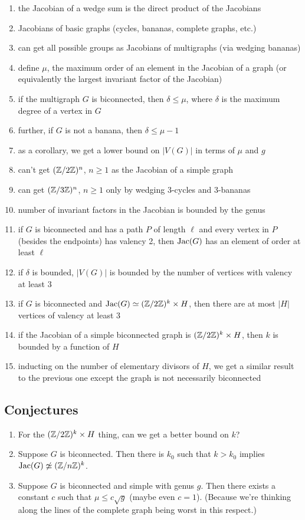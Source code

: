 \documentclass{amsart}
\begin{document}
\begin{enumerate}
\item the Jacobian of a wedge sum is the direct product
of the Jacobians
\item Jacobians of basic graphs (cycles, bananas,
complete graphs, etc.)
\item can get all possible groups as Jacobians of
multigraphs (via wedging bananas)
\item define $\mu$, the maximum order of an element in
the Jacobian of a graph (or equivalently the largest
invariant factor of the Jacobian)
\item if the multigraph $G$ is biconnected, then
$\delta\le\mu$, where $\delta$ is the maximum degree
of a vertex in $G$
\item further, if $G$ is not a banana, then
$\delta\le\mu-1$
\item as a corollary, we get a lower bound on $|V(G)|$
in terms of $\mu$ and $g$
\item can't get $(\mathbb{Z}/2\mathbb{Z})^n$, $n\ge1$ as the Jacobian
of a simple graph
\item can get $(\mathbb{Z}/3\mathbb{Z})^n$, $n\ge1$ only by wedging
3-cycles and 3-bananas
\item number of invariant factors in the Jacobian is
bounded by the genus
\item if $G$ is biconnected and has a path $P$ of length $\ell$ and every vertex in $P$ (besides the endpoints) has valency 2, then $\operatorname{Jac}(G)$ has an element of order at least $\ell$
\item if $\delta$ is bounded, $|V(G)|$ is bounded by the number of vertices with
valency at least 3
\item if $G$ is biconnected and $\operatorname{Jac}(G)\simeq(\mathbb{Z}/2\mathbb{Z})^k\times H$, then there are at most $|H|$ vertices of valency at least 3
\item if the Jacobian of a simple biconnected graph is $(\mathbb{Z}/2\mathbb{Z})^k
\times H$, then $k$ is bounded by a function of $H$
\item inducting on the number of elementary divisors of $H$, we get a similar result to the previous one except the graph is not necessarily biconnected
\end{enumerate}

\subsection{Conjectures}

\begin{enumerate}
\item For the $(\mathbb{Z}/2\mathbb{Z})^k\times H$ thing, can we get a better bound on $k$?
\item Suppose $G$ is biconnected. Then there is $k_0$ such that $k>k_0$ implies $\operatorname{Jac}(G)\not\simeq(\mathbb{Z}/n\mathbb{Z})^k$.
\item Suppose $G$ is biconnected and simple with genus $g$. Then there exists a constant $c$ such that $\mu\le c\sqrt{g}$ (maybe even $c=1$). (Because we're thinking along the lines of the complete graph being worst in this respect.)
\end{enumerate}
\end{document}
